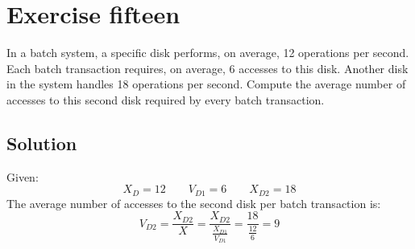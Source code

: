 \section{Exercise fifteen}

In a batch system, a specific disk performs, on average, 12 operations per second. 
Each batch transaction requires, on average, 6 accesses to this disk. 
Another disk in the system handles 18 operations per second.
Compute the average number of accesses to this second disk required by every batch transaction.

\subsection*{Solution}
Given:
\[X_D=12 \qquad V_{D1}=6\qquad X_{D2}=18\]
The average number of accesses to the second disk per batch transaction is:
\[V_{D2}=\dfrac{X_{D2}}{X}=\dfrac{X_{D2}}{\frac{X_{D1}}{V_{D1}}}=\dfrac{18}{\frac{12}{6}}=9\]